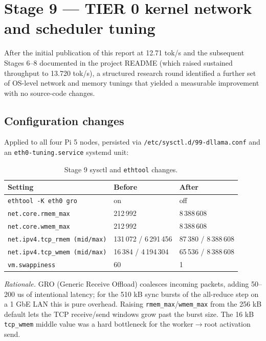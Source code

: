 \documentclass[10pt,a4paper]{article}
\begin{document}
\section{Stage 9 --- TIER 0 kernel network and scheduler tuning}
\label{sec:stage9}

After the initial publication of this report at 12.71 tok/s and the subsequent Stages 6--8 documented in the project README (which raised sustained throughput to 13.720 tok/s), a structured research round identified a further set of OS-level network and memory tunings that yielded a measurable improvement with no source-code changes.

\subsection{Configuration changes}

Applied to all four Pi 5 nodes, persisted via \texttt{/etc/sysctl.d/99-dllama.conf} and an \texttt{eth0-tuning.service} systemd unit:

\begin{table}[H]
\centering
\small
\begin{tabular}{lll}
\toprule
\textbf{Setting} & \textbf{Before} & \textbf{After} \\
\midrule
\texttt{ethtool -K eth0 gro} & on & off \\
\texttt{net.core.rmem\_max}  & 212\,992 & 8\,388\,608 \\
\texttt{net.core.wmem\_max}  & 212\,992 & 8\,388\,608 \\
\texttt{net.ipv4.tcp\_rmem (mid/max)} & 131\,072 / 6\,291\,456 & 87\,380 / 8\,388\,608 \\
\texttt{net.ipv4.tcp\_wmem (mid/max)} & 16\,384 / 4\,194\,304 & 65\,536 / 8\,388\,608 \\
\texttt{vm.swappiness}       & 60 & 1 \\
\bottomrule
\end{tabular}
\caption{Stage 9 sysctl and \texttt{ethtool} changes.}
\end{table}

\textit{Rationale.} GRO (Generic Receive Offload) coalesces incoming packets, adding 50--200 us of intentional latency; for the 510 kB sync bursts of the all-reduce step on a 1 GbE LAN this is pure overhead. Raising \texttt{rmem\_max}/\texttt{wmem\_max} from the 256 kB default lets the TCP receive/send windows grow past the burst size. The 16 kB \texttt{tcp\_wmem} middle value was a hard bottleneck for the worker$\to$root activation send.
\end{document}
